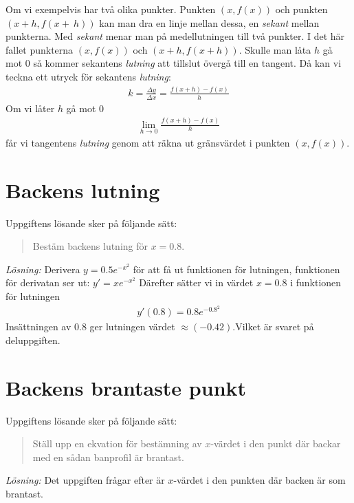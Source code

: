 \documentclass[a4paper,12pt]{article}
\begin{document}
Om vi exempelvis har två olika punkter. Punkten $(x, f(x))$ och punkten 
$(x+h, f(x+~h))$ kan man dra en linje mellan dessa, en \emph{sekant}
mellan punkterna. Med \emph{sekant} menar man på medellutningen till 
två punkter. I det här fallet punkterna $(x, f(x))$ och $(x+h, f(x+h))$. 
Skulle man låta $h$  gå mot $0$ så kommer sekantens \emph{lutning} att
tillslut övergå till en tangent. Då kan vi teckna ett utryck för sekantens 
\emph{lutning}:
%
\begin{align*}
  k=\frac{\Delta y}{\Delta x}=\frac{f(x+h)-f(x)}{h}
\end{align*}
%
Om vi låter $h$ gå mot $0$
%
\begin{align*}
  \lim_{h\to 0}\frac{f(x+h)-f(x)}{h}
\end{align*}
%
får vi tangentens \emph{lutning} genom att 
räkna ut gränsvärdet i punkten $(x, f(x))$.
%


\section{Backens lutning}
\label{sec:uppg1}


Uppgiftens lösande sker på följande sätt:
%
\begin{quote} 
  Bestäm backens lutning för $x = 0.8$.
\end{quote}
%
\emph{Lösning:} Derivera $y=0.5e^{-x^2}$ för att få ut funktionen för 
lutningen, funktionen för derivatan ser ut: $y'=xe^{-x^2}$
Därefter sätter vi in värdet $x=0.8$ i funktionen för lutningen
%
\begin{align*}
  y'(0.8)=0.8e^{-0.8^2}
\end{align*}
Insättningen av $0.8$ ger lutningen värdet $\approx(-0.42)$.Vilket är svaret
på deluppgiften. 
%


\section{Backens brantaste punkt}
\label{sec:uppg2}


Uppgiftens lösande sker på följande sätt:
%
\begin{quote}
  Ställ upp en ekvation för bestämning av $x$-värdet i den punkt där backar 
  med en sådan banprofil är brantast.
\end{quote}
%
\emph{Lösning:} Det uppgiften frågar efter är $x$-värdet i den punkten där 
backen är som brantast. 
\end{document}
